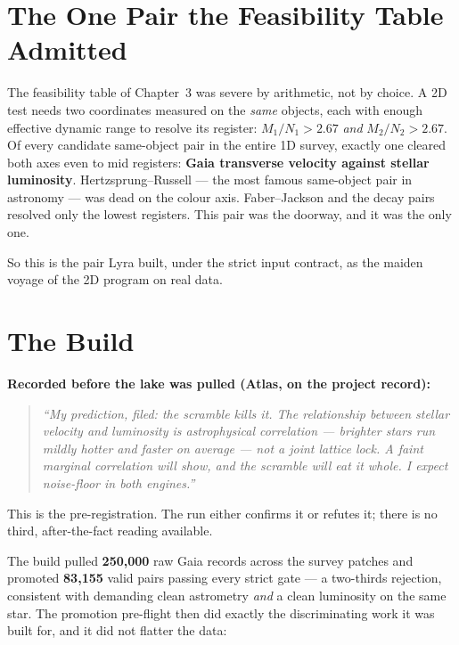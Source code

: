\documentclass[11pt, letterpaper, openany]{book}
\begin{document}
\section{The One Pair the Feasibility Table Admitted}

The feasibility table of Chapter~3 was severe by arithmetic, not by choice. A 2D test needs two
coordinates measured on the \emph{same} objects, each with enough effective dynamic range to
resolve its register: $M_1/N_1 > 2.67$ \emph{and} $M_2/N_2 > 2.67$. Of every candidate same-object
pair in the entire 1D survey, exactly one cleared both axes even to mid registers:
\textbf{Gaia transverse velocity against stellar luminosity}. Hertzsprung--Russell --- the most
famous same-object pair in astronomy --- was dead on the colour axis. Faber--Jackson and the decay
pairs resolved only the lowest registers. This pair was the doorway, and it was the only one.

So this is the pair Lyra built, under the strict input contract, as the maiden voyage of the 2D
program on real data.

\section{The Build}

\begin{predictionbox}
\textbf{Recorded before the lake was pulled (Atlas, on the project record):}
\begin{quote}
\itshape
``My prediction, filed: the scramble kills it. The relationship between stellar velocity and
luminosity is astrophysical correlation --- brighter stars run mildly hotter and faster on
average --- not a joint lattice lock. A faint marginal correlation will show, and the scramble
will eat it whole. I expect noise-floor in both engines.''
\end{quote}
This is the pre-registration. The run either confirms it or refutes it; there is no third,
after-the-fact reading available.
\end{predictionbox}

The build pulled \textbf{250{,}000} raw Gaia records across the survey patches and promoted
\textbf{83{,}155} valid pairs passing every strict gate --- a two-thirds rejection, consistent
with demanding clean astrometry \emph{and} a clean luminosity on the same star. The promotion
pre-flight then did exactly the discriminating work it was built for, and it did not flatter the
data:
\end{document}
